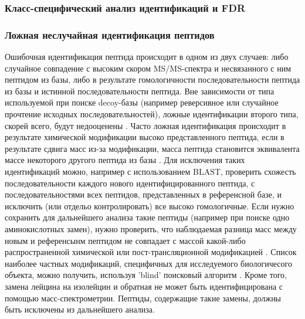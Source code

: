 \subsubsection{Класс-специфический анализ идентификаций и FDR}


\subsubsection{Ложная неслучайная идентификация пептидов}
Ошибочная идентификация пептида происходит в одном из двух случаев: либо случайное совпадение с высоким скором MS/MS-спектра и несвязанного с ним пептидом из базы, либо в результате гомологичности последовательности пептида из базы и истинной последовательности пептида. Вне зависимости от типа используемой при поиске decoy-базы (например реверсивное или случайное прочтение исходных последовательностей), ложные идентификации второго типа, скорей всего, будут недооценены \cite{nesvizhskii2010survey}. Часто ложная идентификация происходит в результате химической модификации высоко представленного пептида, если в результате сдвига масс из-за модификации, масса пептида становится эквивалента массе некоторого другого пептида из базы \cite{nesvizhskii2006dynamic, abraham2013moving}. Для исключения таких идентификаций можно, например с использованием BLAST, проверить схожесть последовательности каждого нового идентифицированного пептида, с последовательностями всех пептидов, представленных в референсной базе, и исключить (или отдельо контролировать) все высоко гомологичные. Если нужно сохранить для дальнейшего анализа такие пептиды (например при поиске одно аминокислотных замен), нужно проверить, что наблюдаемая разница масс между новым и референсынм пептидом не совпадает с массой какой-либо распространенной химической или пост-трансляционной модификацией \cite{li2011bioinformatics}. Список наиболее частных модификаций, специфичных для исследуемого биологичесого объекта, можно получить, используя 'blind' поисковый алгоритм \cite{tsur2005identification}. Кроме того, замена лейцина на изолейцин и обратная не может быть идентифицирована с помощью масс-спектрометрии. Пептиды, содержащие такие замены, должны быть исключены из дальнейшего анализа.

